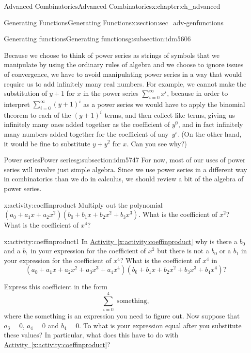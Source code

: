 \documentclass[oneside,10pt,]{book}
\numberwithin{equation}{chapter}
\begin{document}
\begin{chapterptx}{Advanced Combinatorics}{}{Advanced Combinatorics}{}{}{x:chapter:ch_advanced}
\begin{sectionptx}{Generating Functions}{}{Generating Functions}{}{}{x:section:sec_adv-genfunctions}
\begin{subsectionptx}{Generating functions}{}{Generating functions}{}{}{g:subsection:idm5606}
\par
Because we choose to think of power series as strings of symbols that we manipulate by using the ordinary rules of algebra and we choose to ignore issues of convergence, we have to avoid manipulating power series in a way that would require us to add infinitely many real numbers. For example, we cannot make the substitution of \(y+1\) for \(x\) in the power series \(\sum_{i=0}^\infty x^i\), because in order to interpret \(\sum_{i=0}^\infty (y+1)^i\) as a power series we would have to apply the binomial theorem to each of the \((y+1)^i\) terms, and then collect like terms, giving us infinitely many ones added together as the coefficient of \(y^0\), and in fact infinitely many numbers added together for the coefficient of any~\(y^i\). (On the other hand, it would be fine to substitute \(y+y^2\) for \(x\). Can you see why?)%
\end{subsectionptx}
%
%
\typeout{************************************************}
\typeout{************************************************}
%
\begin{subsectionptx}{Power series}{}{Power series}{}{}{g:subsection:idm5747}
For now, most of our uses of power series will involve just simple algebra. Since we use power series in a different way in combinatorics than we do in calculus, we should review a bit of the algebra of power series.%
\begin{activity}{}{x:activity:coeffinproduct}%
Multiply out the polynomial \((a_0 +a_1x+a_2x^2)(b_0+b_1x+b_2x^2+b_3x^3)\). What is the coefficient of \(x^2\)? What is the coefficient of \(x^4\)?%
\end{activity}
\begin{activity}{}{x:activity:coeffinproduct1}%
In \hyperref[x:activity:coeffinproduct]{Activity~\ref{x:activity:coeffinproduct}} why is there a \(b_0\) and a \(b_1\) in your expression for the coefficient of \(x^2\) but there is not a \(b_0\) or a \(b_1\) in your expression for the coefficient of \(x^4\)? What is the coefficient of \(x^4\) in%
\begin{equation*}
(a_0+a_1x+a_2x^2+a_3x^3+a_4x^4)(b_0+b_1x+b_2x^2
+b_3x^3+b_4x^4)?
\end{equation*}
%
\par
Express this coefficient in the form%
\begin{equation*}
\sum_{i=0}^4 \mbox{ something} ,
\end{equation*}
where the something is an expression you need to figure out. Now suppose that \(a_3=0\), \(a_4=0\) and \(b_4=0\). To what is your expression equal after you substitute these values? In particular, what does this have to do with \hyperref[x:activity:coeffinproduct]{Activity~\ref{x:activity:coeffinproduct}}?%

\end{activity}
\end{subsectionptx}
\end{sectionptx}
\end{chapterptx}
\end{document}
